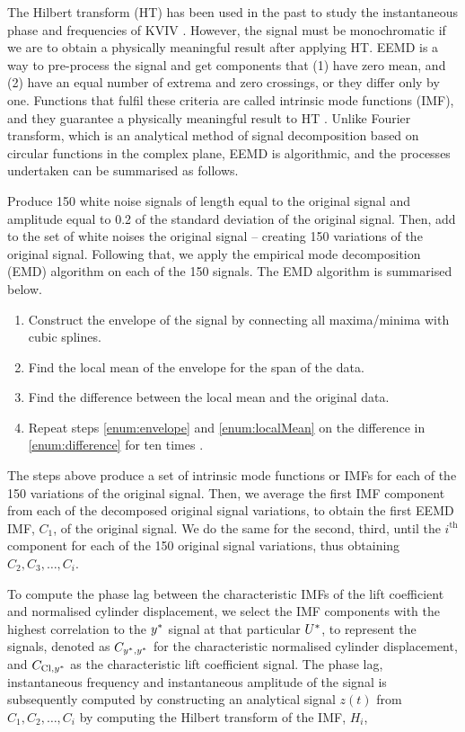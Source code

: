 \documentclass[oneside]{utmthesis}
\begin{document}
The Hilbert transform (HT) has been used in the past to study the instantaneous phase and frequencies of KVIV \citep{Khalak1999}. However, the signal must be monochromatic if we are to obtain a physically meaningful result after applying HT. EEMD is a way to pre-process the signal and get components that (1) have zero mean, and (2) have an equal number of extrema and zero crossings, or they differ only by one. Functions that fulfil these criteria are called intrinsic mode functions (IMF), and they guarantee a physically meaningful result to HT \citep{Gumelar2019,Zhou2019}. Unlike Fourier transform, which is an analytical method of signal decomposition based on circular functions in the complex plane, EEMD is algorithmic, and the processes undertaken can be summarised as follows.

Produce 150 white noise signals of length equal to the original signal and amplitude equal to 0.2 of the standard deviation of the original signal. Then, add to the set of white noises the original signal -- creating 150 variations of the original signal. Following that, we apply the empirical mode decomposition (EMD) algorithm on each of the 150 signals. The EMD algorithm is summarised below.

\begin{enumerate} \label{enumerate:emd}
  \item Construct the envelope of the signal by connecting all maxima/minima with cubic splines. \label{enum:envelope}
  \item Find the local mean of the envelope for the span of the data. \label{enum:localMean}
  \item Find the difference between the local mean and the original data. \label{enum:difference}
  \item Repeat steps \ref{enum:envelope} and \ref{enum:localMean} on the difference in \ref{enum:difference} for ten times \citep{Wu2008}.
\end{enumerate}

The steps above produce a set of intrinsic mode functions or IMFs for each of the 150 variations of the original signal. Then, we average the first IMF component from each of the decomposed original signal variations, to obtain the first EEMD IMF, $C_{1}$, of the original signal. We do the same for the second, third, until the $i^{\text{th}}$ component for each of the 150 original signal variations, thus obtaining $C_{2},C_{3},\dots,C_{i}$.

To compute the phase lag between the characteristic IMFs of the lift coefficient and normalised cylinder displacement, we select the IMF components with the highest correlation to the $y^{*}$ signal at that particular $U^{*}$, to represent the signals, denoted as $C_{y^{*},y^{*}}$ for the characteristic normalised cylinder displacement, and $C_{\text{Cl},y^{*}}$ as the characteristic lift coefficient signal. The phase lag, instantaneous frequency and instantaneous amplitude of the signal is subsequently computed by constructing an analytical signal $z \left( t \right)$ from $C_{1},C_{2},\dots,C_{i}$ by computing the Hilbert transform of the IMF, $H_{i}$,
\end{document}
